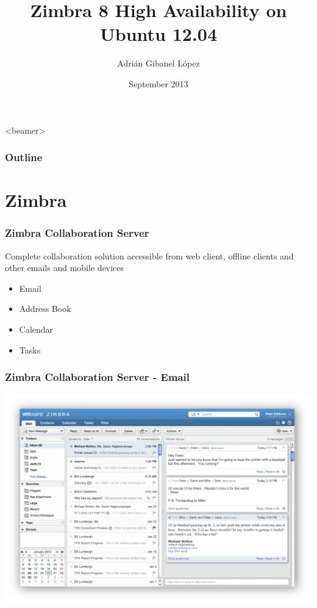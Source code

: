 \documentclass[10pt]{beamer}
\title[Zimbra 8 High Availability on Ubuntu 12.04]{Zimbra 8 High Availability on Ubuntu 12.04}
\author[Adri\'an Gibanel L\'opez] %
{Adri\'an Gibanel L\'opez}
\institute[Universitat de Lleida] %
{Universitat de Lleida}
\date[]{September 2013}
\begin{document}



\begin{frame}
  \titlepage
\end{frame}


  \begin{frame}<beamer>
    \frametitle{Outline}
    \tableofcontents[section]
  \end{frame}


\section {Zimbra}
\begin{frame}
\frametitle{Zimbra Collaboration Server}


\begin{block}{}
Complete collaboration solution accessible from web client, offline clients and other emails and mobile devices
\end{block}


\quad

\begin{itemize}

\item Email
\item Address Book
\item Calendar
\item Tasks

\end{itemize}

\end{frame}

\begin{frame}
\frametitle{Zimbra Collaboration Server - Email}

\begin{center}
  \includegraphics[scale=0.4,keepaspectratio=true]{./img/zimbra-email.jpg}
\end{center}
\end{frame}
\end{document}
